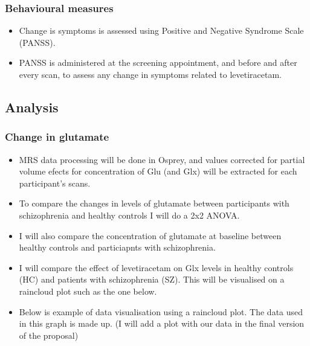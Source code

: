 \documentclass[
  letterpaper,
  DIV=11,
  numbers=noendperiod]{scrartcl}
\providecommand{\tightlist}{%
  \setlength{\itemsep}{0pt}\setlength{\parskip}{0pt}}\usepackage{longtable,booktabs,array}
\begin{document}
\subsubsection{Behavioural measures}\label{behavioural-measures}

\begin{itemize}
\tightlist
\item
  Change is symptoms is assessed using Positive and Negative Syndrome
  Scale (PANSS).
\item
  PANSS is administered at the screening appointment, and before and
  after every scan, to assess any change in symptoms related to
  levetiracetam.
\end{itemize}

\subsection{Analysis}\label{analysis}

\subsubsection{Change in glutamate}\label{change-in-glutamate}

\begin{itemize}
\tightlist
\item
  MRS data processing will be done in Osprey, and values corrected for
  partial volume efects for concentration of Glu (and Glx) will be
  extracted for each participant's scans.
\item
  To compare the changes in levels of glutamate between participants
  with schizophrenia and healthy controls I will do a 2x2 ANOVA.
\item
  I will also compare the concentration of glutamate at baseline between
  healthy controls and particiapnts with schizophrenia.
\item
  I will compare the effect of levetiracetam on Glx levels in healthy
  controls (HC) and patients with schizophrenia (SZ). This will be
  visualised on a raincloud plot such as the one below.
\item
  Below is example of data visualisation using a raincloud plot. The
  data used in this graph is made up. (I will add a plot with our data
  in the final version of the proposal)
\end{itemize}
\end{document}
